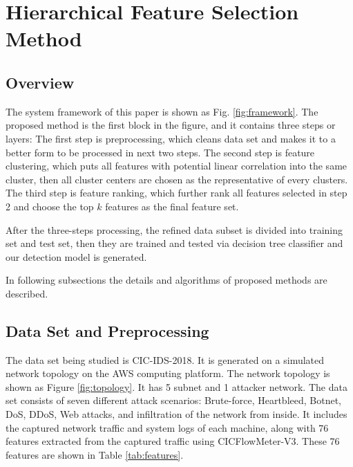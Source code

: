 \documentclass[journal]{IEEEtran}
\begin{document}
\section{Hierarchical Feature Selection Method}
\label{sec:methods}

\subsection{Overview}

The system framework of this paper is shown as Fig. \ref{fig:framework}. 
The proposed method is the first block in the figure, and it contains three steps or layers: The first step is preprocessing, which cleans data set and makes it to a better form to be processed in next two steps. The second step is feature clustering, which puts all features with potential linear correlation into the same cluster, then all cluster centers are chosen as the representative of every clusters. The third step is feature ranking, which further rank all features selected in step 2 and choose the top $k$ features as the final feature set. 

After the three-steps processing, the refined data subset is divided into training set and test set, then they are trained and tested via decision tree classifier and our detection model is generated.

In following subsections the details and algorithms of proposed methods are described.

\subsection{Data Set and Preprocessing}

The data set being studied is CIC-IDS-2018\cite{cic2018}. 
It is generated on a simulated network topology on the AWS computing platform. The network topology is shown as Figure \ref{fig:topology}. It has 5 subnet and 1 attacker network.  
The data set consists of seven different attack scenarios: Brute-force, Heartbleed, Botnet, DoS, DDoS, Web attacks, and infiltration of the network from inside. It includes the captured network traffic and system logs of each machine, along with 76 features extracted from the captured traffic using CICFlowMeter-V3\cite{cicflowmeter}. These 76 features are shown in Table \ref{tab:features}.
\end{document}
